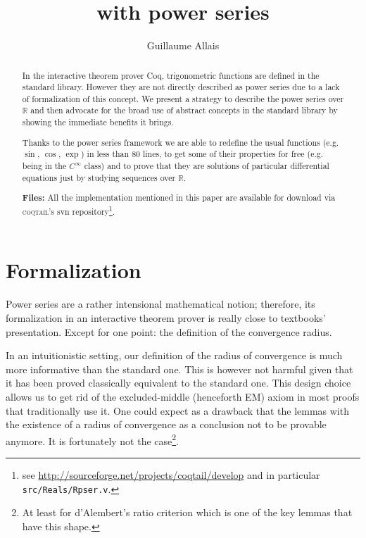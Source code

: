 \documentclass[submission,copyright]{eptcs}
\title{\coq{} with power series}
\author{Guillaume Allais
\institute{Junior Laboratory \coqtail{}\\
Ens Lyon - France\\}
\email{guillaume.allais@ens-lyon.org}}
\newcommand{\coq}{Coq}
\newcommand{\coqtail}{\textsc{coqtail}}
\newcommand{\R}{\mathbb{R}}
\begin{document}
\maketitle

\begin{abstract}
In the interactive theorem prover \coq{}\cite{coq}, trigonometric
functions are defined in the standard library. However they are not
directly described as power series  due to a lack of formalization of
this concept. We present a strategy to describe the power series over
$\R$ and then advocate for the broad use of abstract concepts in the
standard library by showing the immediate benefits it brings.

Thanks to the power series framework we are able to redefine the usual
functions (e.g. $\sin$, $\cos$, $\exp$) in less than 80 lines,
to get some of their properties for free (e.g. being in the $C^{\infty}$
class) and to prove that they are solutions of particular differential
equations just by studying sequences over $\R$.

\textbf{Files:} All the implementation mentioned in this paper are
available for download via \coqtail{}'s svn repository\footnote{see
\url{http://sourceforge.net/projects/coqtail/develop}
and in particular \texttt{src/Reals/Rpser.v}.}.

\end{abstract}

\section{Formalization}

Power series are a rather intensional mathematical notion; therefore, its 
formalization in an interactive theorem prover is really close to  
textbooks' presentation. Except for one point: the definition of the
convergence radius.

In an intuitionistic setting, our definition of the radius of convergence
is much more informative than the standard one.  This is however not
harmful given that it has been proved classically equivalent
to the standard one. This design choice allows us to get rid of the
excluded-middle (henceforth EM) axiom in most proofs that traditionally use
it. One could expect as a drawback that the lemmas with the existence of
a radius of convergence as a conclusion not to be provable anymore. It is
fortunately not the case\footnote{At least for d'Alembert's ratio criterion
which is one of the key lemmas that have this shape.}.
\end{document}
